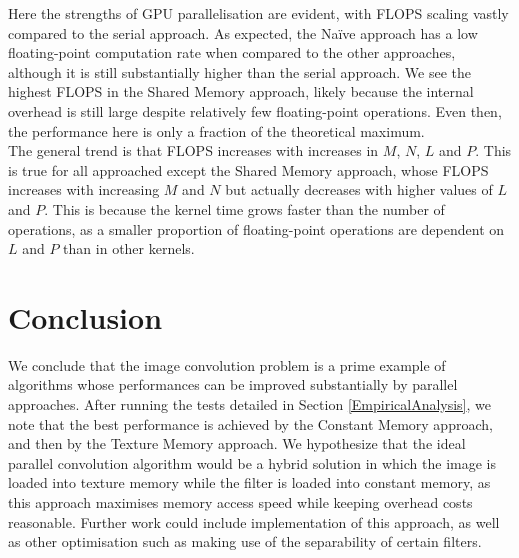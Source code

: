 \documentclass[10pt]{article}
\begin{document}
Here the strengths of GPU parallelisation are evident, with FLOPS scaling vastly compared to the serial approach. As expected, the Na\"{i}ve approach has a low floating-point computation rate when compared to the other approaches, although it is still substantially higher than the serial approach. We see the highest FLOPS in the Shared Memory approach, likely because the internal overhead is still large despite relatively few floating-point operations. Even then, the performance here is only a fraction of the theoretical maximum.
\\
The general trend is that FLOPS increases with increases in $M$, $N$, $L$ and $P$. This is true for all approached except the Shared Memory approach, whose FLOPS increases with increasing $M$ and $N$ but actually decreases with higher values of $L$ and $P$. This is because the kernel time grows faster than the number of operations, as a smaller proportion of floating-point operations are dependent on $L$ and $P$ than in other kernels.
\section{Conclusion}
We conclude that the image convolution problem is a prime example of algorithms whose performances can be improved substantially by parallel approaches. After running the tests detailed in Section \ref{EmpiricalAnalysis}, we note that the best performance is achieved by the Constant Memory approach, and then by the Texture Memory approach. We hypothesize that the ideal parallel convolution algorithm would be a hybrid solution in which the image is loaded into texture memory while the filter is loaded into constant memory, as this approach maximises memory access speed while keeping overhead costs reasonable. Further work could include implementation of this approach, as well as other optimisation such as making use of the separability of certain filters.


\end{document}

